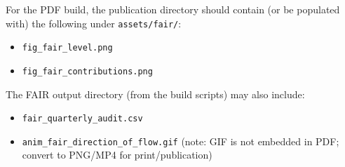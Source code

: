 \documentclass[11pt,a4paper]{article}
\begin{document}
For the PDF build, the publication directory should contain (or be populated with) the following under \texttt{assets/fair/}:
\begin{itemize}
  \item \texttt{fig\_fair\_level.png}
  \item \texttt{fig\_fair\_contributions.png}
\end{itemize}

The FAIR output directory (from the build scripts) may also include:
\begin{itemize}
  \item \texttt{fair\_quarterly\_audit.csv}
  \item \texttt{anim\_fair\_direction\_of\_flow.gif} (note: GIF is not embedded in PDF; convert to PNG/MP4 for print/publication)
\end{itemize}
\end{document}
